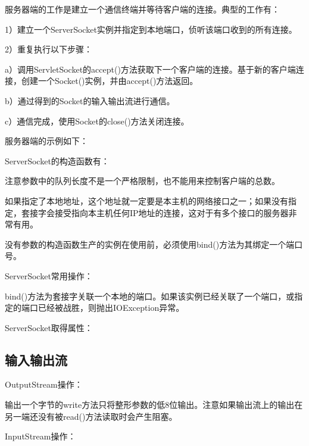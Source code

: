 		服务器端的工作是建立一个通信终端并等待客户端的连接。典型的工作有：

		1）建立一个ServerSocket实例并指定到本地端口，侦听该端口收到的所有连接。

		2）重复执行以下步骤：

		a）调用ServletSocket的accept()方法获取下一个客户端的连接。基于新的客户端连接，创建一个Socket()实例，并由accept()方法返回。

		b）通过得到的Socket的输入输出流进行通信。

		c）通信完成，使用Socket的close()方法关闭连接。

		服务器端的示例如下：

		

		ServerSocket的构造函数有：

		

		注意参数中的队列长度不是一个严格限制，也不能用来控制客户端的总数。

		如果指定了本地地址，这个地址就一定要是本主机的网络接口之一；如果没有指定，套接字会接受指向本主机任何IP地址的连接，这对于有多个接口的服务器非常有用。

		没有参数的构造函数生产的实例在使用前，必须使用bind()方法为其绑定一个端口号。

		ServerSocket常用操作：

		

		bind()方法为套接字关联一个本地的端口。如果该实例已经关联了一个端口，或指定的端口已经被战胜，则抛出IOException异常。

		ServerSocket取得属性：

		
		
	\subsection{输入输出流}

		OutputStream操作：

		
		
		输出一个字节的write方法只将整形参数的低8位输出。注意如果输出流上的输出在另一端还没有被read()方法读取时会产生阻塞。

		InputStream操作：

		

